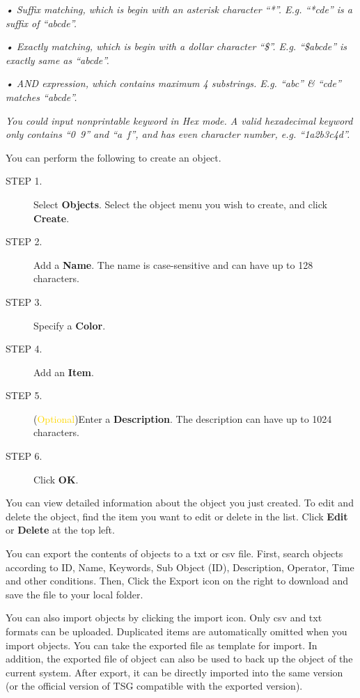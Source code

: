 \textit{• Suffix matching, which is begin with an asterisk character “*”. E.g. “*cde” is a suffix of “abcde”.}


\textit{• Exactly matching, which is begin with a dollar character “\$”. E.g. “\$abcde” is exactly same as “abcde”.}


\textit{• AND expression, which contains maximum 4 substrings. E.g. “abc” \& “cde” matches “abcde”.}


\textit{You could input nonprintable keyword in Hex mode. A valid hexadecimal keyword only contains “0~9” and “a~f”, and has even character number, e.g. “1a2b3c4d”.}


You can perform the following to create an object.

\begin{description}
    \item[STEP 1.]	Select \textbf{Objects}. Select the object menu you wish to create, and click \textbf{Create}.
    \item[STEP 2.]	Add a \textbf{Name}. The name is case-sensitive and can have up to 128 characters.
    \item[STEP 3.]	Specify a \textbf{Color}.
    \item[STEP 4.]	Add an \textbf{Item}.
    \item[STEP 5.]	(\textcolor{gold}{Optional})Enter a \textbf{Description}. The description can have up to 1024 characters.
    \item[STEP 6.]	Click \textbf{OK}.
\end{description}

You can view detailed information about the object you just created. To edit and delete the object, find the item you want to edit or delete in the list. Click \textbf{Edit} or \textbf{Delete} at the top left.


You can export the contents of objects to a txt or csv file. First, search objects according to ID, Name, Keywords, Sub Object (ID), Description, Operator, Time and other conditions. Then, Click the Export icon on the right to download and save the file to your local folder.


You can also import objects by clicking the import icon. Only csv and txt formats can be uploaded. Duplicated items are automatically omitted when you import objects. You can take the exported file as template for import. In addition, the exported file of object can also be used to back up the object of the current system. After export, it can be directly imported into the same version (or the official version of TSG compatible with the exported version).


